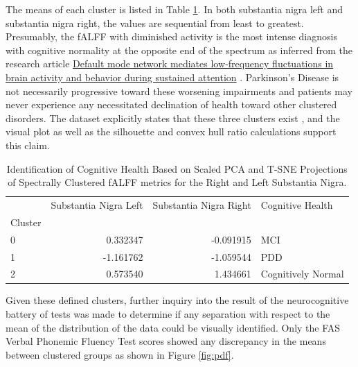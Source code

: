 \documentclass[12pt]{article}
\begin{document}
\FloatBarrier  %

The means of each cluster is listed in Table \ref{tab:example}. In both substantia nigra left and substantia nigra right, the values are sequential from least to greatest. Presumably, the fALFF with diminished activity is the most intense diagnosis with cognitive normality at the opposite end of the spectrum as inferred from the research article \href{https://pmc.ncbi.nlm.nih.gov/articles/PMC9704793/}{Default mode network mediates low‐frequency fluctuations in brain activity and behavior during sustained attention} \cite{35903957}. Parkinson's Disease is not necessarily progressive toward these worsening impairments and patients may never experience any necessitated declination of health toward other clustered disorders. The dataset explicitly states that these three clusters exist \cite{ds004392:1.0.0}, and the visual plot as well as the silhouette and convex hull ratio calculations support this claim.

\begin{table}[ht]
\centering
\begin{tabular}{lrrl}
    \toprule
     & Substantia Nigra Left & Substantia Nigra Right & Cognitive Health \\
    Cluster &  &  &  \\
    \midrule
    0 & 0.332347 & -0.091915 & MCI \\
    1 & -1.161762 & -1.059544 & PDD \\
    2 & 0.573540 & 1.434661 & Cognitively Normal \\
    \bottomrule
\end{tabular}
\caption{Identification of Cognitive Health Based on Scaled PCA and T-SNE Projections of Spectrally Clustered fALFF metrics for the Right and Left Substantia Nigra.}
\label{tab:example}  %
\end{table}

\FloatBarrier  %

Given these defined clusters, further inquiry into the result of the neurocognitive battery of tests was made to determine if any separation with respect to the mean of the distribution of the data could be visually identified. Only the FAS Verbal Phonemic Fluency Test scores showed any discrepancy in the means between clustered groups as shown in Figure \ref{fig:pdf}.
\end{document}
